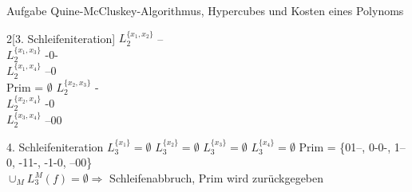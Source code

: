 \begin{frame}[allowframebreaks]{Aufgabe \thesection}{Quine-McCluskey-Algorithmus, Hypercubes und Kosten eines Polynoms}
    \begin{solutionnoinc}
      \tiny
        \begin{multicols*}{2}[3. Schleifeniteration]
            $L^{\{x_1,x_2\}}_2$ -- \\[0.5cm]
            $L^{\{x_1,x_3\}}_2$ -0- \\[0.5cm]
            $L^{\{x_1,x_4\}}_2$ --0 \\[0.5cm]
            Prim = $\emptyset$ \newline
            \columnbreak
            \newline
            $L^{\{x_2,x_3\}}_2$ - \\[0.5cm]
            $L^{\{x_2,x_4\}}_2$ -0 \\[0.5cm]
            $L^{\{x_3,x_4\}}_2$ \newline
            --00 \\[0.25cm]
        \end{multicols*}
    \end{solutionnoinc}

    \begin{solution}
        \tiny
            4. Schleifeniteration\newline \newline
            $L^{\{x_1\}}_3 = \emptyset$ \newline \newline
            $L^{\{x_2\}}_3 = \emptyset$ \newline \newline
            $L^{\{x_3\}}_3 = \emptyset$ \newline \newline
            $L^{\{x_4\}}_3 = \emptyset$ \newline \newline
            Prim = \{01--, 0-0-, 1--0, -11-, -1-0, --00\} \\[0.25cm]
            $\cup_M L^M_3(f) = \emptyset \Rightarrow$ Schleifenabbruch, Prim wird zurückgegeben
    \end{solution}


\end{frame}

